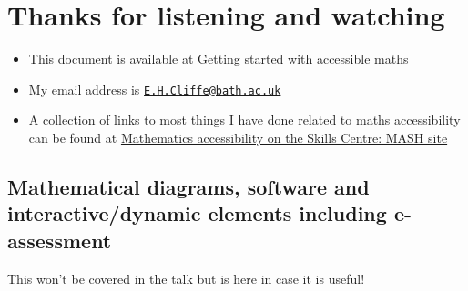 \documentclass[
  12pt,
  a4paper]{extarticle}
\providecommand{\tightlist}{%
  \setlength{\itemsep}{0pt}\setlength{\parskip}{0pt}}
\renewcommand{\;}{\,}
\begin{document}
\hypertarget{thanks-for-listening-and-watching}{%
\section{Thanks for listening and watching}\label{thanks-for-listening-and-watching}}

\begin{itemize}
\tightlist
\item
  This document is available at \href{https://stem-enable.github.io/Getting-started-with-accessible-maths/index.html}{Getting started with accessible maths}
\item
  My email address is \href{mailto:E.H.Cliffe@bath.ac.uk}{\nolinkurl{E.H.Cliffe@bath.ac.uk}}
\item
  A collection of links to most things I have done related to maths accessibility can be found at \href{https://www.bath.ac.uk/projects/mathematics-accessibility/}{Mathematics accessibility on the Skills Centre: MASH site}
\end{itemize}

\hypertarget{mathematical-diagrams-software-and-interactivedynamic-elements-including-e-assessment}{%
\subsection{Mathematical diagrams, software and interactive/dynamic elements including e-assessment}\label{mathematical-diagrams-software-and-interactivedynamic-elements-including-e-assessment}}

This won't be covered in the talk but is here in case it is useful!
\end{document}
